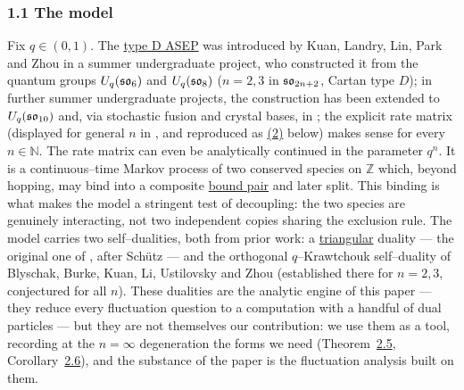 \documentclass[11pt]{article}
\theoremstyle{plain}
\theoremstyle{definition}
\theoremstyle{remark}
\newcommand{\Z}{\mathbb{Z}}\newcommand{\R}{\mathbb{R}}\newcommand{\N}{\mathbb{N}}
\begin{document}
  

\subsubsection{1.1 The model}\label{sec_intromodel}
Fix $q\in(0,1)$. The \underline{type D ASEP} was introduced by Kuan, Landry, Lin, Park and
Zhou \cite{KLLPZ} in a summer undergraduate project, who constructed it from the quantum groups $U_q(\mathfrak{so}_6)$ and
$U_q(\mathfrak{so}_8)$ ($n=2,3$ in $\mathfrak{so}_{2n+2}$, Cartan type $D$); in further summer undergraduate projects, the construction has been extended to $U_q(\mathfrak{so}_{10})$ \cite{RSL} and, via stochastic fusion and crystal bases, in
\cite{BEPS}; the explicit rate matrix (displayed for general $n$ in \cite[\S2.1]{REU},
and reproduced as \hyperref[eq_nrates]{(2)} below) makes sense for every $n\in\N$. The rate matrix can even be analytically continued in the parameter $q^n$. It is a continuous--time Markov process of two conserved species on $\Z$ which, beyond
hopping, may bind into a composite \underline{bound pair} and later split. This binding is
what makes the model a stringent test of decoupling: the two species are genuinely
interacting, not two independent copies sharing the exclusion rule. The model carries
two self--dualities, both from prior work: a \underline{triangular} duality --- the
original one of \cite{KLLPZ}, after Sch\"utz \cite{SchutzDual} --- and the orthogonal
$q$--Krawtchouk self--duality of Blyschak, Burke, Kuan, Li, Ustilovsky and Zhou
\cite{REU} (established there for $n=2,3$, conjectured for all $n$). These dualities
are the analytic engine of this paper --- they reduce every fluctuation question to a
computation with a handful of dual particles --- but they are not themselves our
contribution: we use them as a tool, recording at the $n=\infty$ degeneration the
forms we need (Theorem~\hyperref[thm_dual]{2.5}, Corollary~\hyperref[cor_tri]{2.6}), and the substance of
the paper is the fluctuation analysis built on them.
\end{document}
